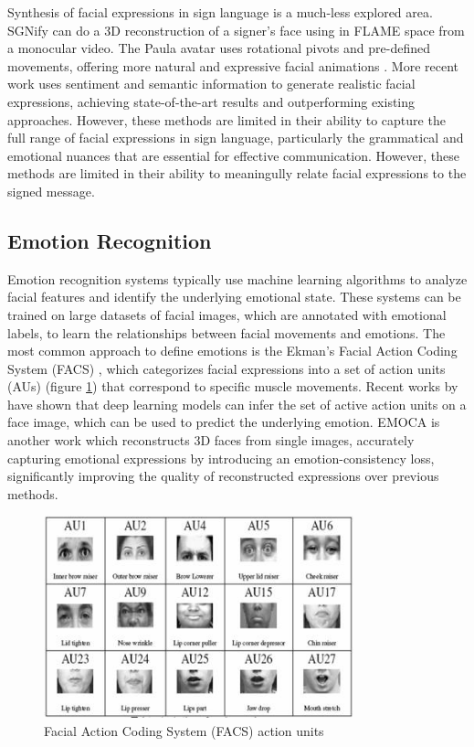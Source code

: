 \documentclass[../../main.tex]{subfiles}
\begin{document}
Synthesis of facial expressions in sign language is a much-less explored area. SGNify \cite{Forte_2023_CVPR} can do a 3D reconstruction of a signer's face using in FLAME \cite{FLAME} space from a monocular video. The Paula avatar uses rotational pivots and pre-defined movements, offering more natural and expressive facial animations \cite{johnson-2022-improved}. More recent work \cite{azevedo2024empowering} uses sentiment and semantic information to generate realistic facial expressions, achieving state-of-the-art results and outperforming existing approaches. However, these methods are limited in their ability to capture the full range of facial expressions in sign language, particularly the grammatical and emotional nuances that are essential for effective communication. However, these methods are limited in their ability to meaningully relate facial expressions to the signed message.

\subsection{Emotion Recognition}
\label{ch:facial_expressions:related_work:emotion_recognition}

Emotion recognition systems typically use machine learning algorithms to analyze facial features and identify the underlying emotional state. These systems can be trained on large datasets of facial images, which are annotated with emotional labels, to learn the relationships between facial movements and emotions. The most common approach to define emotions is the Ekman's Facial Action Coding System (FACS) \cite{ekman1978facial}, which categorizes facial expressions into a set of action units (AUs) (figure \ref{fig:action_units})  that correspond to specific muscle movements. Recent works by \cite{luo2022learning} have shown that deep learning models can infer the set of active action units on a face image, which can be used to predict the underlying emotion. EMOCA \cite{danvevcek2022emoca} is another work which reconstructs 3D faces from single images, accurately capturing emotional expressions by introducing an emotion-consistency loss, significantly improving the quality of reconstructed expressions over previous methods.

\begin{figure}
    \centering
    \includegraphics[width=0.8\textwidth]{chapters/facial_expressions/images/action_units.jpg}
    \caption{Facial Action Coding System (FACS) action units}
    \label{fig:action_units}
\end{figure}
\end{document}

